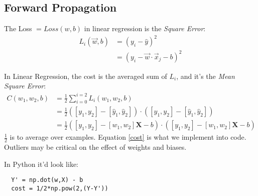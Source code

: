 \subsection{Forward Propagation}
The Loss $= Loss(w,b)$ in linear regression is the \textit{Square Error}:
\begin{align*}
  L_i(\vec{w}, b) &= (y_i - \hat{y})^2\\
  &=(y_i -\vec{w}\cdot{}\vec{x}_j -b)^2
\end{align*}

In Linear Regression, the cost is the averaged sum of $L_i$, and it's the \textit{Mean Square Error}:
\begin{align}
  C(w_1, w_2, b) &= \frac{1}{2} \sum_{i=0}^{i=2} L_i(w_1, w_2, b)\\
  &= \frac{1}{2}([y_1, y_2] - [\hat{y}_1, \hat{y}_2])\cdot{}([y_1, y_2]-[\hat{y}_1, \hat{y}_2])\\
  &=\frac{1}{2}([y_1, y_2] - [w_1, w_2]\mathbf{X}-b)\cdot{}([y_1, y_2] - [w_1,w_2]\mathbf{X} -b) \label{cost}
\end{align}
$\frac{1}{2}$ is to average over examples. Equation \ref{cost} is what we implement into code.
Outliers may be critical on the effect of weights and biases.

In Python it'd look like:
\begin{center}
  \begin{verbatim}
  Y' = np.dot(w,X) - b
  cost = 1/2*np.pow(2,(Y-Y'))
  \end{verbatim}
\end{center}





